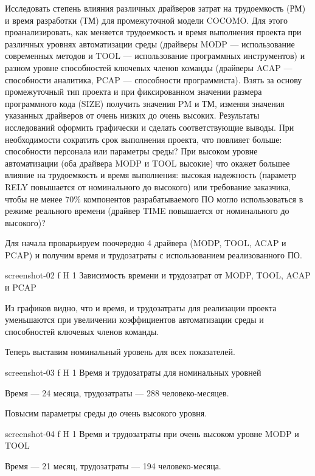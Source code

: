 \documentclass{bmstu}
\begin{document}
Исследовать степень влияния различных драйверов затрат на трудоемкость (РМ) и время разработки (ТМ) для промежуточной модели COCOMO. 
Для этого проанализировать, как меняется трудоемкость и время выполнения проекта при различных уровнях автоматизации среды (драйверы MODP --- использование современных методов и TOOL --- использование программных инструментов) и разном уровне способностей ключевых членов команды (драйверы ACAP --- способности аналитика, PCAP --- способности программиста). 
Взять за основу промежуточный тип проекта и при фиксированном значении размера программного кода (SIZE) получить значения PM и ТМ, изменяя значения указанных драйверов от очень низких до очень высоких. 
Результаты исследований оформить графически и сделать соответствующие выводы. 
При необходимости сократить срок выполнения проекта, что повлияет больше: способности персонала или параметры среды? 
При высоком уровне автоматизации (оба драйвера MODP и TOOL высокие) что окажет большее влияние на трудоемкость и время выполнения: высокая надежность (параметр RELY повышается от номинального до высокого) или требование заказчика, чтобы не менее 70\% компонентов разрабатываемого ПО могло использоваться в режиме реального времени (драйвер TIME повышается от номинального до высокого)?

Для начала проварьируем поочередно 4 драйвера (MODP, TOOL, ACAP и PCAP) и получим время и трудозатраты с использованием реализованного ПО.

    {screenshot-02}
    {f}
    {H}
    {1\textwidth}
    {Зависимость времени и трудозатрат от MODP, TOOL, ACAP и PCAP}
    
Из графиков видно, что и время, и трудозатраты для реализации проекта уменьшаются при увеличении коэффициентов автоматизации среды и способностей ключевых членов команды.

Теперь выставим номинальный уровень для всех показателей. 

    {screenshot-03}
    {f}
    {H}
    {1\textwidth}
    {Время и трудозатраты для номинальных уровней}
    
Время --- 24 месяца, трудозатраты --- 288 человеко-месяцев.

Повысим параметры среды до очень высокого уровня. 

    {screenshot-04}
    {f}
    {H}
    {1\textwidth}
    {Время и трудозатраты при очень высоком уровне MODP и TOOL}
    
Время --- 21 месяц, трудозатраты --- 194 человеко-месяца.
\end{document}
